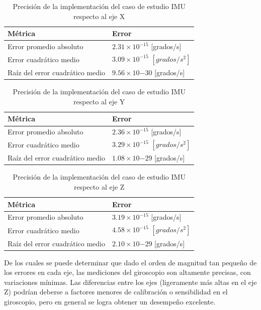 \begin{table}[htbp!]
    \centering
    \caption{Precisión de la implementación del caso de estudio IMU respecto al eje X}
    \label{tab:filter-errorz}
    \begin{tabular}{ll}
    Métrica                       & Error \\ \hline
    Error promedio absoluto         &   $2.31 \times 10^{-15}$ [grados/s]    \\
    Error cuadrático medio          &   $3.09 \times 10^{-15}$ $[grados/s^{2}]$    \\
    Raíz del error cuadrático medio &   $9.56 \times 10{-30}$ [grados/s]  
    \end{tabular}
    \end{table}


\begin{table}[htbp!]
    \centering
    \caption{Precisión de la implementación del caso de estudio IMU respecto al eje Y}
    \label{tab:filter-errory}
    \begin{tabular}{ll}
    Métrica                       & Error \\ \hline
    Error promedio absoluto         &   $2.36 \times 10^{-15}$ [grados/s]    \\
    Error cuadrático medio          &   $3.29 \times 10^{-15}$ $[grados/s^{2}]$    \\
    Raíz del error cuadrático medio &   $1.08 \times 10{-29}$ [grados/s]  
    \end{tabular}
    \end{table}

\begin{table}[htbp!]
    \centering
    \caption{Precisión de la implementación del caso de estudio IMU respecto al eje Z}
    \label{tab:filter-errorz}
    \begin{tabular}{ll}
    Métrica                       & Error \\ \hline
    Error promedio absoluto         &   $3.19 \times 10^{-15}$ [grados/s]    \\
    Error cuadrático medio          &   $4.58 \times 10^{-15}$ $[grados/s^{2}]$    \\
    Raíz del error cuadrático medio &   $2.10 \times 10{-29}$ [grados/s]  
    \end{tabular}
    \end{table}

De los cuales se puede determinar que dado el orden de magnitud tan pequeño de los errores en cada eje, las mediciones del giroscopio son altamente precisas, con variaciones mínimas. Las diferencias entre los ejes (ligeramente más altas en el eje Z) podrían deberse a factores menores de calibración o sensibilidad en el giroscopio, pero en general se logra obtener un desempeño excelente.


